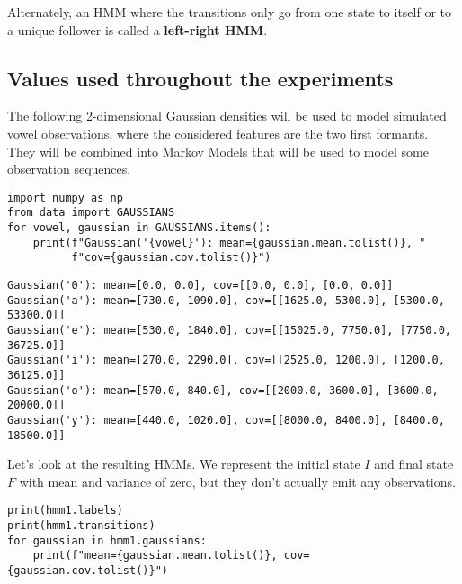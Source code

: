 \documentclass[11pt]{article}
\begin{document}
\begin{center}

\end{center}

Alternately, an HMM where the transitions only go from one state to
itself or to a unique follower is called a \textbf{left-right HMM}.

\begin{center}

\end{center}

\subsection{Values used throughout the experiments}
\label{sec:orge0b1f6a}
The following 2-dimensional Gaussian densities will be used to model
simulated vowel observations, where the considered features are the two
first formants. They will be combined into Markov Models that will be
used to model some observation sequences.

\begin{verbatim}
import numpy as np
from data import GAUSSIANS
for vowel, gaussian in GAUSSIANS.items():
    print(f"Gaussian('{vowel}'): mean={gaussian.mean.tolist()}, "
          f"cov={gaussian.cov.tolist()}")
\end{verbatim}

\begin{verbatim}
Gaussian('0'): mean=[0.0, 0.0], cov=[[0.0, 0.0], [0.0, 0.0]]
Gaussian('a'): mean=[730.0, 1090.0], cov=[[1625.0, 5300.0], [5300.0, 53300.0]]
Gaussian('e'): mean=[530.0, 1840.0], cov=[[15025.0, 7750.0], [7750.0, 36725.0]]
Gaussian('i'): mean=[270.0, 2290.0], cov=[[2525.0, 1200.0], [1200.0, 36125.0]]
Gaussian('o'): mean=[570.0, 840.0], cov=[[2000.0, 3600.0], [3600.0, 20000.0]]
Gaussian('y'): mean=[440.0, 1020.0], cov=[[8000.0, 8400.0], [8400.0, 18500.0]]
\end{verbatim}


Let's look at the resulting HMMs. We represent the initial state \(I\) and
final state \(F\) with mean and variance of zero, but they don't actually
emit any observations.

\begin{verbatim}
print(hmm1.labels)
print(hmm1.transitions)
for gaussian in hmm1.gaussians:
    print(f"mean={gaussian.mean.tolist()}, cov={gaussian.cov.tolist()}")
\end{verbatim}
\end{document}

